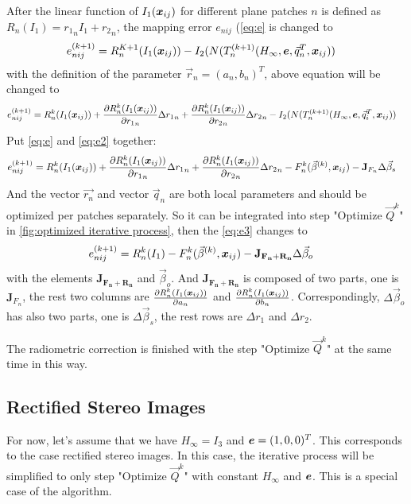 After the linear function of $I_1(\boldsymbol{x}_{ij})$ for different plane patches $n$ is defined as $R_n(I_1) = {r_1}_n I_1 + {r_2}_n$, the mapping error $e_{nij}$ (\cref{eq:e} is changed to 
\begin{align}
	e_{nij}^{(k+1)} &= R_n^{K+1}(I_1(\boldsymbol{x}_{ij}))- I_2(N(T^{(k+1)}_n(H_{\infty}, \boldsymbol{e}, \vec{q}_n^T, \boldsymbol{x}_{ij})) 
\end{align}
with the definition of the parameter $\vec{r}_n = (a_n, b_n)^T$, above equation will be changed to 
\begin{align}\label{eq:e2}
	e_{nij}^{(k+1)} &= R_n^{k}(I_1(\boldsymbol{x}_{ij})) + \frac{\partial R_n^{k}(I_1(\boldsymbol{x}_{ij}))}{\partial {r_1}_n} \Delta {r_1}_n + \frac{\partial R_n^{k}(I_1(\boldsymbol{x}_{ij}))}{\partial {r_2}_n} \Delta {r_2}_n -  I_2(N(T^{(k+1)}_n(H_{\infty}, \boldsymbol{e}, \vec{q}_i^T, \boldsymbol{x}_{ij})) 
\end{align}
Put \cref{eq:e} and \cref{eq:e2} together:
\begin{align}\label{eq:e3}
		e_{nij}^{(k+1)} &= R_n^{k}(I_1(\boldsymbol{x}_{ij})) + \frac{\partial R_n^{k}(I_1(\boldsymbol{x}_{ij}))}{\partial {r_1}_n} \Delta {r_1}_n + \frac{\partial R_n^{k}(I_1(\boldsymbol{x}_{ij}))}{\partial {r_2}_n} \Delta {r_2}_n - F_n^k(\vec{\beta}^{(k)}, \boldsymbol{x}_{ij}) - \mathbf{J}_{F_n} \Delta\vec{\beta}_s
\end{align}
And the vector $\vec{r_n}$ and vector $\vec{q}_n$ are both local parameters and should be optimized per patches separately. So it can be integrated into step "Optimize $\vec{Q}^k$" in \cref{fig:optimized iterative process}, then the \cref{eq:e3} changes to 
\begin{align}
	e_{nij}^{(k+1)} &= R_n^{k}(I_1) - F_n^k(\vec{\beta}^{(k)}, \boldsymbol{x}_{ij}) - \mathbf{J_{F_n+R_n}} \Delta\vec{\beta}_{o}
\end{align}
with the elements $\mathbf{J_{F_n+R_n}}$ and $\vec{\beta}_{o}$. And  $\mathbf{J_{F_n+R_n}}$ is composed of two parts, one is $\mathbf{J}_{F_n}$, the rest two columns are $ \frac{\partial R_n^{k}(I_1(\boldsymbol{x}_{ij}))}{\partial a_n}$ and $\frac{\partial R_n^{k}(I_1(\boldsymbol{x}_{ij}))}{\partial b_n}$. Correspondingly, $\Delta\vec{\beta}_{o}$ has also two parts, one is $\Delta\vec{\beta}_s$, the rest rows are $\Delta r_1$ and $\Delta r_2$.

The radiometric correction is finished with the step "Optimize $\vec{Q}^k$" at the same time in this way.

\subsection{Rectified Stereo Images}\label{subsec:Rectified Stereo Images}
For now, let's assume that we have $H_\infty = I_3$ and $\boldsymbol{e} = (1, 0, 0)^T$. This corresponds to the case rectified stereo images. In this case, the iterative process will be simplified to only step "Optimize $\vec{Q}^k$"  with constant $H_\infty$ and $\boldsymbol{e}$. This is a special case of the algorithm.  

